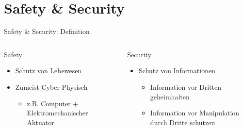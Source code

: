 \section{Safety \& Security}

\begin{frame}[T]{Safety \& Security: Definition}
\small
  \begin{columns}[t,fullwidth]
   \hfill
    \begin{column}{.45\linewidth}
      \begin{block}{Safety}
      \begin{itemize}
        \item Schutz von Lebewesen
        \item Zumeist Cyber-Physisch
      \begin{itemize}
         \item z.B. Computer + Elektromechanischer Aktuator
      \end{itemize}
      \end{itemize}
      \end{block}
    \end{column}
    \hfill
    \begin{column}{.45\linewidth}
      \begin{block}{Security}
      \begin{itemize}
        \item Schutz von Informationen
        \begin{itemize}
          \item Information vor Dritten geheimhalten
          \item Information vor Manipulation durch Dritte schützen
        \end{itemize}
      \end{itemize}
      \end{block}
    \end{column}
    \hfill
  \end{columns}
\end{frame}

